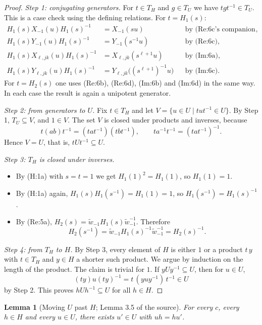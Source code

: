 \documentclass[11pt]{article}
\newtheorem{lemma}[theorem]{Lemma}
\theoremstyle{definition}
\theoremstyle{remark}
\newcommand{\wt}{\widetilde{w}}
\begin{document}
\begin{proof}
\emph{Step 1: conjugating generators.} For $t\in T_H$ and $g\in T_U$ we have $tgt^{-1}\in T_U$. This is a case check using the defining relations. For $t=H_1(s)$:
\begin{align*}
H_1(s)X_{-1}(u)H_1(s)^{-1}&=X_{-1}(su) && \text{by (Re:6c's companion (Re:6a))},\\
H_1(s)Y_{-1}(u)H_1(s)^{-1}&=Y_{-1}(s^{-1}u) && \text{by (Re:6c)},\\
H_1(s)X_{\ell,jk}(u)H_1(s)^{-1}&=X_{\ell,jk}(s^{\ell+1}u) && \text{by (Im:6a)},\\
H_1(s)Y_{\ell,jk}(u)H_1(s)^{-1}&=Y_{\ell,jk}\big((s^{\ell+1})^{-1}u\big) && \text{by (Im:6c)}.
\end{align*}
For $t=H_2(s)$ one uses (Re:6b), (Re:6d), (Im:6b) and (Im:6d) in the same way. In each case the result is again a unipotent generator.

\emph{Step 2: from generators to $U$.} Fix $t\in T_H$ and let $V=\{u\in U \mid tut^{-1}\in U\}$. By Step 1, $T_U\subseteq V$, and $1\in V$. The set $V$ is closed under products and inverses, because
\[
t(ab)t^{-1}=(tat^{-1})(tbt^{-1}),\qquad ta^{-1}t^{-1}=(tat^{-1})^{-1}.
\]
Hence $V=U$, that is, $tUt^{-1}\subseteq U$.

\emph{Step 3: $T_H$ is closed under inverses.}
\begin{itemize}
\item By (H:1a) with $s=t=1$ we get $H_1(1)^2=H_1(1)$, so $H_1(1)=1$.
\item By (H:1a) again, $H_1(s)H_1(s^{-1})=H_1(1)=1$, so $H_1(s^{-1})=H_1(s)^{-1}$.
\item By (Re:5a), $H_2(s)=\wt_{-1}H_1(s)\wt_{-1}^{-1}$. Therefore
\[
H_2(s^{-1})=\wt_{-1}H_1(s)^{-1}\wt_{-1}^{-1}=H_2(s)^{-1}.
\]
\end{itemize}

\emph{Step 4: from $T_H$ to $H$.} By Step 3, every element of $H$ is either $1$ or a product $t\,y$ with $t\in T_H$ and $y\in H$ a shorter such product. We argue by induction on the length of the product. The claim is trivial for $1$. If $yUy^{-1}\subseteq U$, then for $u\in U$,
\[
(ty)u(ty)^{-1}=t\,(yuy^{-1})\,t^{-1}\in U
\]
by Step 2. This proves $hUh^{-1}\subseteq U$ for all $h\in H$.
\end{proof}

\begin{lemma}[Moving $U$ past $H$; Lemma 3.5 of the source]
For every $c$, every $h\in H$ and every $u\in U$, there exists $u'\in U$ with $uh=hu'$.
\end{lemma}
\end{document}
